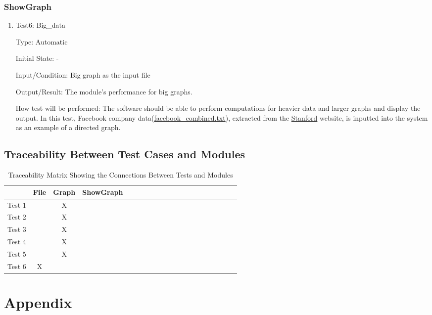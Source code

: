 \documentclass[12pt, titlepage]{article}
\begin{document}
\subsubsection{ShowGraph}
\begin{enumerate}
\item{Test6: Big\_data\\}

Type: Automatic
					
Initial State: -
					
Input/Condition: Big graph as the input file
					
Output/Result:  The module's performance for big graphs.
					
How test will be performed: The software should be able to perform computations for heavier data and larger graphs and display the output. In this test, Facebook company data(\href{https://github.com/AtiyehSayadi/Centrality-In-Graphs/tree/main/test/facebook_combined.txt}{facebook\_combined.txt}), extracted from the \href{https://snap.stanford.edu/data/}{Stanford} website, is inputted into the system as an example of a directed graph.
\end{enumerate}

\subsection{Traceability Between Test Cases and Modules}
\begin{table}[h!]
\centering
\begin{tabular}{|c|c|c|c|c|c|c|c|c|c|c|c|c|c|c|c|c|c|c|c|}
\hline
	&File &Graph &ShowGraph\\
\hline
Test 1     & & X&  \\ \hline
Test 2     & & X&  \\ \hline
Test 3    & & X&  \\ \hline
Test 4     & & X&  \\ \hline
Test 5     & & X&  \\ \hline
Test 6     &X & &  \\ \hline

\end{tabular}
\caption{Traceability Matrix Showing the Connections Between Tests and Modules}
\label{Table:A_trace}
\end{table}

				


\newpage

\section{Appendix}
\end{document}
